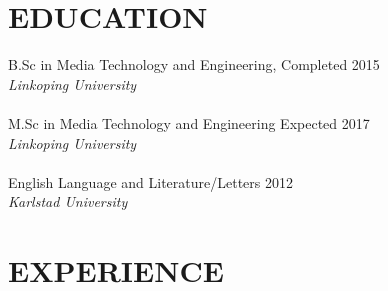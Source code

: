 \documentclass{res}
\begin{document}
 


\address{\bf  PRESENT ADDRESS\\Tunnbindaregatan 21\\602 21 Norrkoping, Sweden\\
+46 727 273125}
\address{\bf ADDITIONAL INFORMATION \\ Github: CarlEnglund \\ Mail: mail@carlenglund.se
\\ Website: www.carlenglund.se}

                                  
\begin{resume}
          
\section{EDUCATION}                
    B.Sc in Media Technology and Engineering, Completed 2015   \\
    \emph{Linkoping University} \\      
    \\ M.Sc in Media Technology and Engineering Expected 2017\\\emph{Linkoping University} \\  
    \\ English Language and Literature/Letters 2012\\\emph{Karlstad University} \\          
       

 
\section{EXPERIENCE}
   \vspace{-0.1in}
	

\end{resume}
\end{document}
